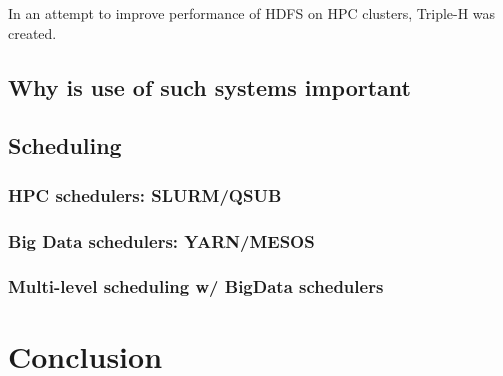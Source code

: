 \documentclass{report}
\begin{document}

	
	
	
    In an attempt to improve performance of HDFS on HPC clusters, Triple-H was
created.  \section{Why is use of such systems important} \section{Scheduling}
\subsection{HPC schedulers: SLURM/QSUB} \subsection{Big Data schedulers:
YARN/MESOS} \subsection{Multi-level scheduling w/ BigData schedulers}
\chapter{Conclusion}




\end{document}
